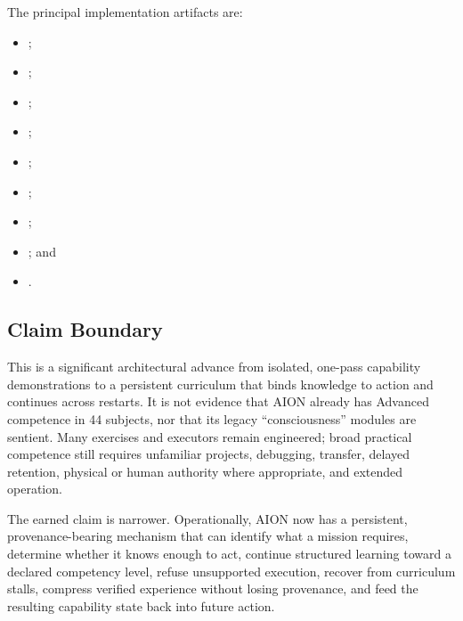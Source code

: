 The principal implementation artifacts are:
\begin{itemize}
    \item {};
    \item {};
    \item {};
    \item {};
    \item {};
    \item {};
    \item {};
    \item {}; and
    \item {}.
\end{itemize}

\subsection{Claim Boundary}
\label{subsec:aion-progressive-claim-boundary}

This is a significant architectural advance from isolated, one-pass capability
demonstrations to a persistent curriculum that binds knowledge to action and
continues across restarts.  It is not evidence that AION already has Advanced
competence in 44 subjects, nor that its legacy ``consciousness'' modules are
sentient.  Many exercises and executors remain engineered; broad practical
competence still requires unfamiliar projects, debugging, transfer, delayed
retention, physical or human authority where appropriate, and extended
operation.

The earned claim is narrower.  Operationally, AION now has a persistent,
provenance-bearing mechanism that can identify what a mission
requires, determine whether it knows enough to act, continue structured
learning toward a declared competency level, refuse unsupported execution,
recover from curriculum stalls, compress verified experience without losing
provenance, and feed the resulting capability state back into future action.
